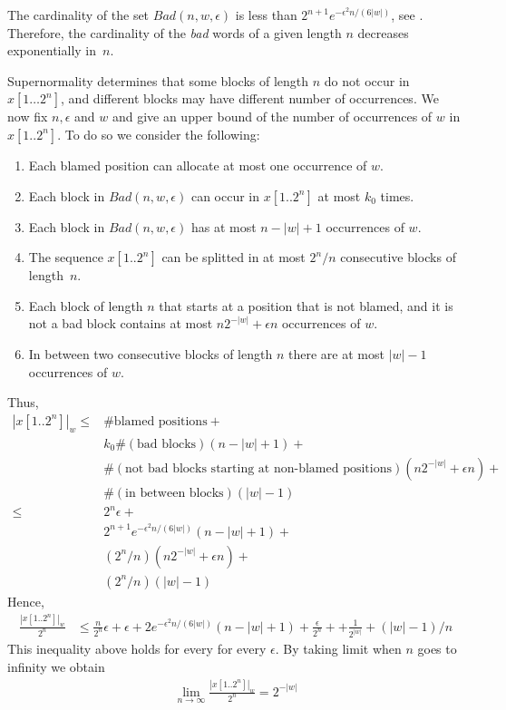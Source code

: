 \documentclass[11pt,a4paper]{tesis}
\begin{document}
The cardinality of the set $Bad(n, w, \epsilon)$ is less than $2^{n+1} e^{-\epsilon^2 n/(6|w|)}$,
see \cite[Lemma 7.3.5]{BC2018}. Therefore, the cardinality of the  \textit{bad} words of a given length $n$ decreases exponentially in~$n$.

Supernormality determines that  some blocks of length $n$
do not occur in $x[1\dots  2^n]$, and different blocks may 
have different number of occurrences.
We now fix $ n, \epsilon$ and $w$ and give an upper bound of  the number of occurrences of $w$ in 
$x[1 .. 2^n]$. To do so we consider the following:
\begin{enumerate}
\item Each blamed position can allocate at most one occurrence of $w$.
\item Each block in $Bad(n, w, \epsilon)$ can occur in $x[1.. 2^n]$
 at most $k_0$ times.
\item Each block in $Bad(n, w, \epsilon)$ has at most $n-|w|+1$ occurrences of $w$.
\item The sequence $x[1..  2^n]$ can be splitted in at most $ 2^n/n$ consecutive blocks
of length~$n$.  
\item Each block  of length $n$ that starts at a position that is not blamed,  and it is not a bad block
 contains at most $n 2^{-|w|} + \epsilon n $ occurrences of $w$.
\item In between two consecutive blocks of length $n$ there are at most $|w|-1$ occurrences of $w$.
\end{enumerate}
Thus,
\begin{align*}
|x[1.. 2^n]|_w \leq &
 \#\text{blamed positions} +
\\& k_0 \#(\text{bad blocks}) (n-|w|+1)+
\\& \#(\text{not bad blocks starting at non-blamed positions}) (n 2^{-|w|} + \epsilon n)+
\\&  \#(\text{in between blocks})  (|w|-1)
\\
\leq& 2^n \epsilon + 
\\& 2^{n+1} e^{-\epsilon^2 n/(6|w|)} (n-|w|+1)+
\\&  ( 2^n /n) (n 2^{-|w|} + \epsilon n)+
\\&  ( 2^n/n) (|w|-1)
\end{align*}
Hence, 
\begin{align*}
\frac{|x[1..  2^n]|_w }{ 2^n}&\leq 
 \frac{n}{ 2^{n}} \epsilon+   \epsilon+
2 e^{-\epsilon^2 n/(6|w|)}  (n-|w|+1)+\frac{ \epsilon}{2^{n}}+
+  \frac{1}{2^{|w|}} + (|w|-1)/n
\end{align*}
This  inequality above holds for every  for every $\epsilon$. By taking limit when $n$ goes to infinity we obtain 
\begin{align*}
\lim_{n\to \infty}\frac{|x[1.. 2^n]|_w }{ 2^n}= {2^{-|w|}}
\end{align*}
\end{document}
